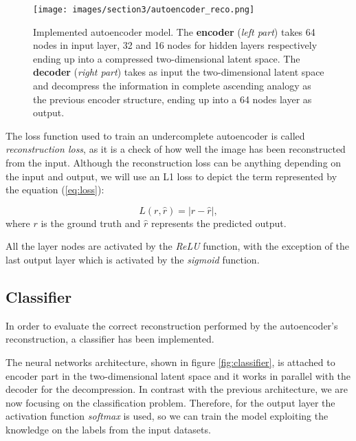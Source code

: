 \documentclass{article}
\begin{document}
\begin{figure}[H]
  \centering
  \texttt{[image: images/section3/autoencoder\_reco.png]}
  \caption{Implemented autoencoder model. The \textbf{encoder} (\textit{left part}) takes 64 nodes in input layer, 32 and 16 nodes for
  hidden layers respectively ending up into a compressed two-dimensional latent space. 
  The \textbf{decoder} (\textit{right part}) takes as input the two-dimensional latent space and decompress the information 
  in complete ascending analogy as the previous encoder structure, ending up into a 64 nodes layer as output.}
  \label{fig:ae}
  \end{figure}

\par The loss function used to train an undercomplete autoencoder is called \textit{reconstruction loss},
as it is a check of how well the image has been reconstructed from the input.
Although the reconstruction loss can be anything depending on the input and output,
we will use an L1 loss to depict the term represented by the equation (\ref{eq:loss}):

\begin{equation}
  L ( r, \hat{r} ) = | r - \hat{r} |,
  \label{eq:loss} 
\end{equation}
where $r$ is the ground truth and $\hat{r}$ represents the predicted output.

\par All the layer nodes are activated by the \textit{ReLU} function, 
with the exception of the last output layer which is activated by the \textit{sigmoid} function. 



\subsection{Classifier}

In order to evaluate the correct reconstruction performed by the autoencoder's reconstruction, a classifier has been implemented.
\par The neural networks architecture, shown in figure \ref{fig:classifier}, is attached to encoder part in the two-dimensional
latent space and it works in parallel with the decoder for the decompression. 
In contrast with the previous architecture, we are now focusing on the classification problem. 
Therefore, for the output layer the activation function \textit{softmax} is used, so we can train the model exploiting 
the knowledge on the labels from the input datasets.
\end{document}

